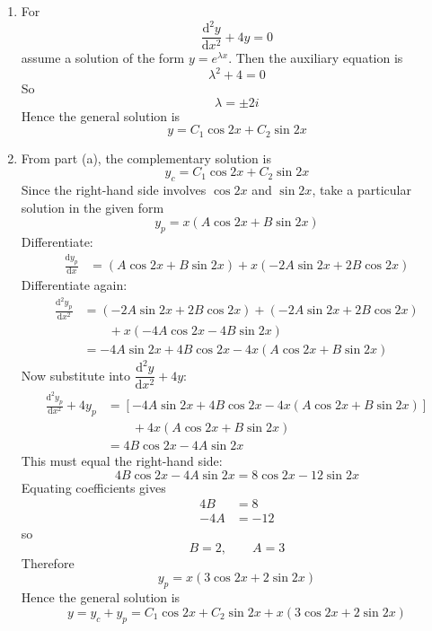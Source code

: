 \documentclass[leqno]{article}
\begin{document}
\begin{enumerate}[
  label=\textbf{\arabic*.},
  leftmargin=*,
  topsep=0pt,
  partopsep=0pt,
  parsep=0pt
]
\begin{tcolorbox}[colback=white, colframe=scarlet, title={\textbf{Solution}}, breakable, grow to left by=6mm, grow to right by=10mm]
\begin{enumerate}[label=\textbf{(\alph*)}]
  \item For
  \[
  \frac{\mathrm{d}^2 y}{\mathrm{d}x^2}+4y=0
  \]
  assume a solution of the form $y=e^{\lambda x}$. Then the auxiliary equation is
  \[
  \lambda^2+4=0
  \]
  So
  \[
  \lambda=\pm 2i
  \]
  Hence the general solution is
  \[
  y=C_1\cos 2x+C_2\sin 2x
  \]

  \item From part (a), the complementary solution is
  \[
  y_c=C_1\cos 2x+C_2\sin 2x
  \]
  Since the right-hand side involves $\cos 2x$ and $\sin 2x$, take a particular solution in the given form
  \[
  y_p=x(A\cos 2x+B\sin 2x)
  \]
  Differentiate:
  \begin{align*}
  \frac{\mathrm{d}y_p}{\mathrm{d}x}
  &= (A\cos 2x+B\sin 2x)+x(-2A\sin 2x+2B\cos 2x)
  \end{align*}
  Differentiate again:
  \begin{align*}
  \frac{\mathrm{d}^2 y_p}{\mathrm{d}x^2}
  &= (-2A\sin 2x+2B\cos 2x)+(-2A\sin 2x+2B\cos 2x) \\
  &\qquad {} + x(-4A\cos 2x-4B\sin 2x) \\
  &= -4A\sin 2x+4B\cos 2x-4x(A\cos 2x+B\sin 2x)
  \end{align*}
  Now substitute into $\dfrac{\mathrm{d}^2 y}{\mathrm{d}x^2}+4y$:
  \begin{align*}
  \frac{\mathrm{d}^2 y_p}{\mathrm{d}x^2}+4y_p
  &= \left[-4A\sin 2x+4B\cos 2x-4x(A\cos 2x+B\sin 2x)\right] \\
  &\qquad {} + 4x(A\cos 2x+B\sin 2x) \\
  &= 4B\cos 2x-4A\sin 2x
  \end{align*}
  This must equal the right-hand side:
  \[
  4B\cos 2x-4A\sin 2x=8\cos 2x-12\sin 2x
  \]
  Equating coefficients gives
  \begin{align*}
  4B &= 8 \\
  -4A &= -12
  \end{align*}
  so
  \[
  B=2,\qquad A=3
  \]
  Therefore
  \[
  y_p=x(3\cos 2x+2\sin 2x)
  \]
  Hence the general solution is
  \[
  y=y_c+y_p=C_1\cos 2x+C_2\sin 2x+x(3\cos 2x+2\sin 2x)
  \]
\end{enumerate}
\end{tcolorbox}


\newpage


\end{enumerate}
\end{document}
